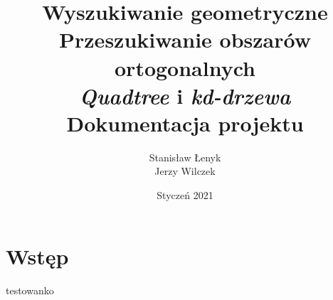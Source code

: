 \documentclass{article}
\title{\textbf{Wyszukiwanie geometryczne} \\ \textbf{Przeszukiwanie obszarów ortogonalnych} \\ \textit{Quadtree} i \textit{kd-drzewa} \\ Dokumentacja projektu}
\author{Stanisław Łenyk \\ Jerzy Wilczek}
\date{Styczeń 2021}
\begin{document}
\maketitle

\newpage

\tableofcontents

\newpage

\section{Wstęp}
testowanko
\end{document}
